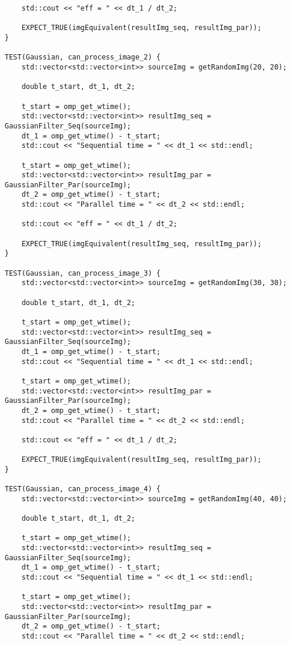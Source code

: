 \documentclass{report}
\begin{document}
\begin{lstlisting}
    std::cout << "eff = " << dt_1 / dt_2;

    EXPECT_TRUE(imgEquivalent(resultImg_seq, resultImg_par));
}

TEST(Gaussian, can_process_image_2) {
    std::vector<std::vector<int>> sourceImg = getRandomImg(20, 20);

    double t_start, dt_1, dt_2;

    t_start = omp_get_wtime();
    std::vector<std::vector<int>> resultImg_seq = GaussianFilter_Seq(sourceImg);
    dt_1 = omp_get_wtime() - t_start;
    std::cout << "Sequential time = " << dt_1 << std::endl;

    t_start = omp_get_wtime();
    std::vector<std::vector<int>> resultImg_par = GaussianFilter_Par(sourceImg);
    dt_2 = omp_get_wtime() - t_start;
    std::cout << "Parallel time = " << dt_2 << std::endl;

    std::cout << "eff = " << dt_1 / dt_2;

    EXPECT_TRUE(imgEquivalent(resultImg_seq, resultImg_par));
}

TEST(Gaussian, can_process_image_3) {
    std::vector<std::vector<int>> sourceImg = getRandomImg(30, 30);

    double t_start, dt_1, dt_2;

    t_start = omp_get_wtime();
    std::vector<std::vector<int>> resultImg_seq = GaussianFilter_Seq(sourceImg);
    dt_1 = omp_get_wtime() - t_start;
    std::cout << "Sequential time = " << dt_1 << std::endl;

    t_start = omp_get_wtime();
    std::vector<std::vector<int>> resultImg_par = GaussianFilter_Par(sourceImg);
    dt_2 = omp_get_wtime() - t_start;
    std::cout << "Parallel time = " << dt_2 << std::endl;

    std::cout << "eff = " << dt_1 / dt_2;

    EXPECT_TRUE(imgEquivalent(resultImg_seq, resultImg_par));
}

TEST(Gaussian, can_process_image_4) {
    std::vector<std::vector<int>> sourceImg = getRandomImg(40, 40);

    double t_start, dt_1, dt_2;

    t_start = omp_get_wtime();
    std::vector<std::vector<int>> resultImg_seq = GaussianFilter_Seq(sourceImg);
    dt_1 = omp_get_wtime() - t_start;
    std::cout << "Sequential time = " << dt_1 << std::endl;

    t_start = omp_get_wtime();
    std::vector<std::vector<int>> resultImg_par = GaussianFilter_Par(sourceImg);
    dt_2 = omp_get_wtime() - t_start;
    std::cout << "Parallel time = " << dt_2 << std::endl;


\end{lstlisting}
\end{document}
